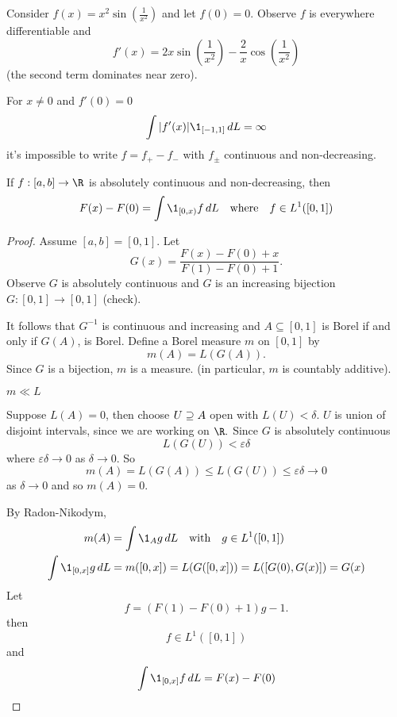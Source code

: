\begin{example}
	Consider $f(x) = x^{2} \sin(\frac{1}{x^2})$ and let $f(0) = 0$.
	Observe $f$ is everywhere differentiable and
	\[
		f'(x) = 2x \sin(\frac{1}{x^{2}}) - \frac{2}{x} \cos(\frac{1}{x^2})
	\] (the second term dominates near zero).

	For $x \neq 0$ and $f'(0) = 0$
	\[
		\int | f'(x) | \1_{[-1, 1]} \, dL = \infty
	\]
	it's impossible to write $f = f_{+} - f_{-}$ with $f_{\pm}$ continuous and non-decreasing.
\end{example}


\begin{lemma}
	If $f : [a,b] \to \R$ is absolutely continuous and non-decreasing, then
	\begin{align*}
		F(x) - F(0) = \int \1_{[0,x)} f \, dL \quad \text{where} \quad f \in L^1 ([0,1])
	\end{align*}
\end{lemma}

\begin{proof}
	Assume $[a,b] = [0,1]$.
	Let
	\[
		G(x) = \frac{F(x) - F(0) + x}{F(1) - F(0) + 1}.
	\]
	Observe $G$ is absolutely continuous and $G$ is an increasing bijection $G: [0,1] \to [0,1]$ (check).

	It follows that $G^{-1}$ is continuous and increasing and $A \subseteq [0,1]$ is Borel if and only if $G(A)$, is Borel.
	Define a Borel measure $m$ on $[0,1]$ by
	\[
		m(A) = L(G(A)).
	\]
	Since $G$ is a bijection, $m$ is a measure. (in particular, $m$ is countably additive).

	\begin{claim}
		$m \ll L$
	\end{claim}

	Suppose $L(A) = 0$, then choose $U \supseteq A$ open with $L(U) < \delta$.
	$U$ is union of disjoint intervals, since we are working on $\R.$
	Since $G$ is absolutely continuous
	\[
		L(G(U)) < \varepsilon \delta
	\] where $\varepsilon \delta \to 0$ as $\delta \to 0$.
	So
	\[
		m(A) = L(G(A)) \leq L(G(U)) \leq \varepsilon \delta \to 0
	\] as $\delta \to 0$ and so $m(A) = 0$.

	By Radon-Nikodym,
	\begin{align*}
		m(A) &= \int \1_{A} g \, dL  \quad \text{with} \quad g \in L^1 ([0,1]) \\
		\int \1_{[0,x]} g \, dL &= m([0,x]) = L(G([0,x])) = L([G(0), G(x)]) = G(x)
	\end{align*}
	Let
	\[
		f = (F(1) - F(0) + 1 ) g - 1.
	\]then
	\[
		f \in L^1([0,1])
	\] and
	\[
		\int \1_{[0,x]} f \, dL = F(x) - F(0)
	\]
\end{proof}

